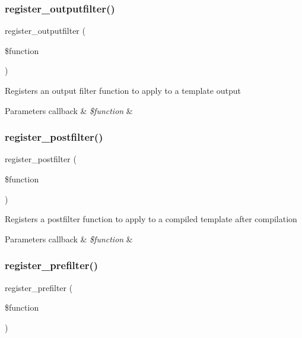 \subsubsection{\texorpdfstring{register\+\_\+outputfilter()}{register\_outputfilter()}}
{\footnotesize\ttfamily register\+\_\+outputfilter (\begin{DoxyParamCaption}\item[{}]{\$function }\end{DoxyParamCaption})}

Registers an output filter function to apply to a template output


\begin{DoxyParams}[1]{Parameters}
callback & {\em \$function} & \\
\hline
\end{DoxyParams}
\mbox{\label{class_smarty_a1eb31d2b852e5862a3d04284614d145b}} 
\subsubsection{\texorpdfstring{register\+\_\+postfilter()}{register\_postfilter()}}
{\footnotesize\ttfamily register\+\_\+postfilter (\begin{DoxyParamCaption}\item[{}]{\$function }\end{DoxyParamCaption})}

Registers a postfilter function to apply to a compiled template after compilation


\begin{DoxyParams}[1]{Parameters}
callback & {\em \$function} & \\
\hline
\end{DoxyParams}
\mbox{\label{class_smarty_afdd4dead058273890d629d207f236239}} 
\subsubsection{\texorpdfstring{register\+\_\+prefilter()}{register\_prefilter()}}
{\footnotesize\ttfamily register\+\_\+prefilter (\begin{DoxyParamCaption}\item[{}]{\$function }\end{DoxyParamCaption})}

